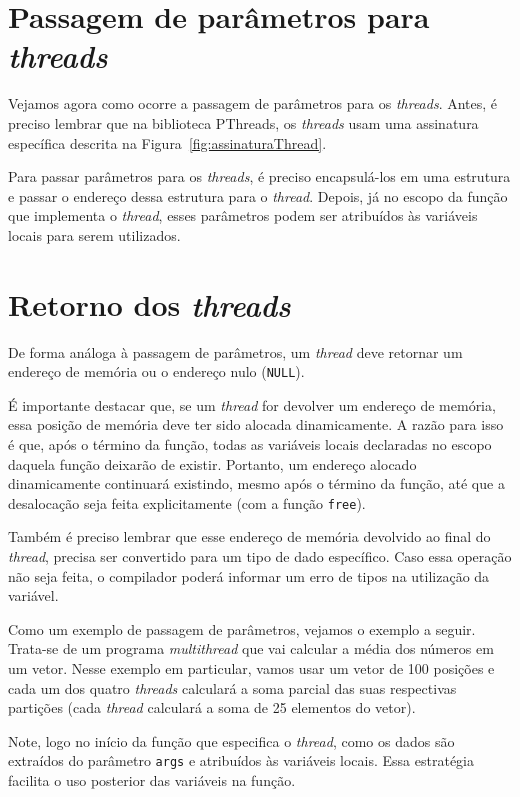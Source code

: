 \section{Passagem de parâmetros para \textit{threads}}
Vejamos agora como ocorre a passagem de parâmetros para os \textit{threads}. Antes, é preciso lembrar que na biblioteca PThreads, os \textit{threads} usam uma assinatura específica descrita na Figura~\ref{fig:assinaturaThread}. 

Para passar parâmetros para os \textit{threads}, é preciso encapsulá-los em uma estrutura e passar o endereço dessa estrutura para o \textit{thread}. Depois, já no escopo da função que implementa o \textit{thread}, esses parâmetros podem ser atribuídos às variáveis locais para serem utilizados.

\section{Retorno dos \textit{threads}}
De forma análoga à passagem de parâmetros, um \textit{thread} deve retornar um endereço de memória ou o endereço nulo (\texttt{NULL}).  

É importante destacar que, se um \textit{thread} for devolver um endereço de memória, essa posição de memória deve ter sido alocada dinamicamente. A razão para isso é que, após o término da função, todas as variáveis locais declaradas no escopo daquela função deixarão de existir. Portanto, um endereço alocado dinamicamente continuará existindo, mesmo após o término da função, até que a desalocação seja feita explicitamente (com a função \texttt{free}).

Também é preciso lembrar que esse endereço de memória devolvido ao final do \textit{thread}, precisa ser convertido para um tipo de dado específico. Caso essa operação não seja feita, o compilador poderá informar um erro de tipos na utilização da variável.

Como um exemplo de passagem de parâmetros, vejamos o exemplo a seguir. Trata-se de um programa \textit{multithread} que vai calcular a média dos números em um vetor. Nesse exemplo em particular, vamos usar um vetor de 100 posições e cada um dos quatro \textit{threads} calculará a soma parcial das suas respectivas partições (cada \textit{thread} calculará a soma de 25 elementos do vetor).

Note, logo no início da função que especifica o \textit{thread}, como os dados são extraídos do parâmetro \texttt{args} e atribuídos às variáveis locais. Essa estratégia facilita o uso posterior das variáveis na função.

